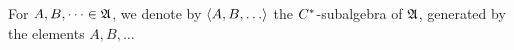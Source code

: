 % 
% 

For $A, B, \dots \in \mathfrak{A}$, we denote by $\gen{A, B, \dots}$ the
$C^{*}$-subalgebra of $\mathfrak{A}$, generated by the elements $A, B, \dots$






% 
% 

 
















